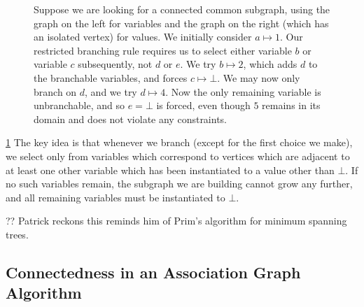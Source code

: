 \documentclass{llncs}
\begin{document}
\begin{figure}[tb]

    \caption{Suppose we are looking for a connected common subgraph, using the graph on the left
        for variables and the graph on the right (which has an isolated vertex) for values. We
        initially consider $a \mapsto 1$. Our restricted branching rule requires us to select either variable
        $b$ or variable $c$ subsequently, not $d$ or $e$. We try $b \mapsto 2$, which adds $d$
        to the branchable variables, and forces $c \mapsto \bot$. We may now only branch on $d$, and
        we try $d \mapsto 4$. Now the only remaining variable is unbranchable, and so $e = \bot$ is forced, even
        though $5$ remains in its domain and does not violate any constraints.}\label{figure:restricted}
\end{figure}

\cref{figure:restricted} The key idea is that whenever we branch (except for the first choice we
make), we select only from variables which correspond to vertices which are adjacent to at least one
other variable which has been instantiated to a value other than $\bot$. If no such variables
remain, the subgraph we are building cannot grow any further, and all remaining variables must be
instantiated to $\bot$.

?? Patrick reckons this reminds him of Prim's algorithm for minimum spanning trees.

\subsection{Connectedness in an Association Graph Algorithm}
\end{document}
